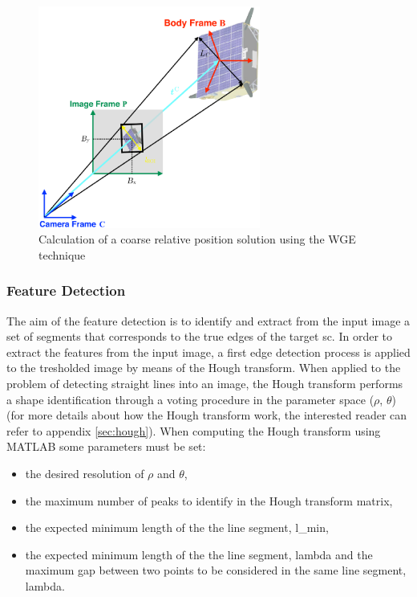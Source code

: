 \begin{figure}[htbp]
  \centering
  \includegraphics[width=0.65\textwidth]{gfx/coarsePoseEstimation.eps}
  \caption{Calculation of a coarse relative position solution using the WGE
    technique \cite{Sharma2018}}
  \label{fig:coarseRelative}
\end{figure}

\subsubsection{Feature Detection}\label{sec:featureextraction}
The aim of the feature detection is to  identify and extract from the input image a set of segments that corresponds to the true edges of the target \acrshort{sc}.
In order to extract the features from the input image, a first edge detection process is applied to the tresholded image by means of the Hough transform. When applied to the problem of detecting straight lines into an image, the Hough transform performs a shape identification through a voting procedure in the parameter space ($\rho$, $\theta$) (for more details about how the Hough transform work, the interested reader can refer to appendix \ref{sec:hough}).
When computing the Hough transform using MATLAB some parameters must be set:

\begin{itemize}
  \item the desired resolution of $\rho$ and $\theta$,
  \item the maximum number of peaks to identify in the Hough transform matrix,
  \item the expected minimum length of the the line segment, \gls{l_min},
  \item the expected minimum length of the the line segment, \gls{lambda} and the maximum gap between two points to be considered in the same line segment, \gls{lambda}.
\end{itemize}

